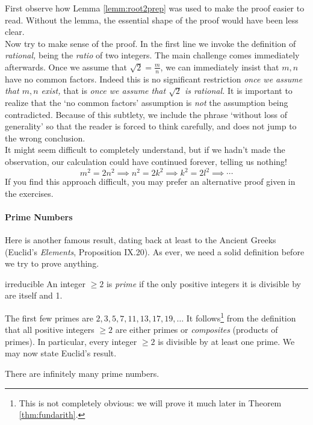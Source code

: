  First observe how Lemma \ref{lemm:root2prep} was used to make the proof easier to read. Without the lemma, the essential shape of the proof would have been less clear.\\
Now try to make sense of the proof. In the first line we invoke the definition of \emph{rational,} being the \emph{ratio} of two integers. The main challenge comes immediately afterwards. Once we assume that $\sqrt 2=\frac mn$, we can immediately insist that $m,n$ have no common factors. Indeed this is no significant restriction \emph{once we assume that $m,n$ exist,} that is \emph{once we assume that $\sqrt 2$ is rational.} It is important to realize that the `no common factors' assumption is \emph{not} the assumption being contradicted. Because of this subtlety, we include the phrase `without loss of generality' so that the reader is forced to think carefully, and does not jump to the wrong conclusion.\\
It might seem difficult to completely understand, but if we hadn't made the observation, our calculation could have continued forever, telling us nothing!
\[m^2=2n^2\implies n^2=2k^2\implies k^2=2l^2\implies\cdots\]
If you find this approach difficult, you may prefer an alternative proof given in the exercises.

\paragraph{Prime Numbers}

Here is another famous result, dating back at least to the Ancient Greeks (Euclid's \emph{Elements}, Proposition IX.20). As ever, we need a solid definition before we try to prove anything.

\begin{defn}{}{irreducible}
An integer $\ge 2$ is \emph{prime} if the only positive integers it is divisible by are itself and 1.
\end{defn}

 The first few primes are $2,3,5,7,11,13,17,19,\ldots$ It follows\footnote{This is not completely obvious: we will prove it much later in Theorem \ref{thm:fundarith}.} from the definition that all positive integers $\ge 2$ are either primes or \emph{composites} (products of primes). In particular, every integer $\ge 2$ is divisible by at least one prime. We may now state Euclid's result.

\begin{thm}{}{}
There are infinitely many prime numbers.
\end{thm}

